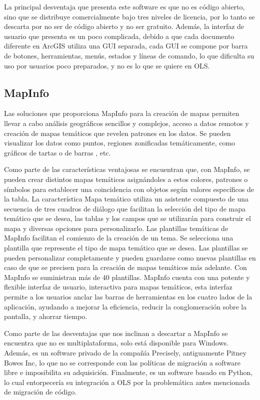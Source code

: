 La principal desventaja que presenta este software es que no es c\'odigo abierto, sino que se distribuye comercialmente bajo tres niveles de licencia, por lo tanto se descarta por no ser de c\'odigo abierto y no ser gratuito. Adem\'as, la interfaz de usuario que presenta es un poco complicada, debido a que cada documento diferente en ArcGIS utiliza una GUI separada, cada GUI se compone por barra de botones, herramientas, men\'us, estados y l\'ineas de comando, lo que dificulta su uso por usuarios poco preparados, y no es lo que se quiere en OLS.


\subsection{MapInfo}
Las soluciones que proporciona MapInfo para la creaci\'on de mapas permiten llevar a cabo an\'alisis geogr\'aficos sencillos y complejos, acceso a datos remotos y creaci\'on de mapas tem\'aticos que revelen patrones en los datos. Se pueden visualizar los
datos como puntos, regiones zonificadas tem\'aticamente, como gr\'aficos de tartas o de barras , etc.

Como parte de las caracter\'isticas ventajosas se encuentran que, con MapInfo, se pueden crear distintos mapas tem\'aticos asign\'andoles a estos colores, patrones o s\'imbolos para establecer una coincidencia con objetos seg\'un valores espec\'ificos de la tabla. La caracter\'istica Mapa tem\'atico utiliza un asistente compuesto de una secuencia de tres cuadros de di\'alogo que facilitan la selecci\'on del tipo de mapa tem\'atico que se desea, las tablas y los campos que se utilizar\'an para construir el mapa y diversas opciones para personalizarlo. Las plantillas tem\'aticas de MapInfo facilitan el comienzo de la creaci\'on de un tema. Se selecciona una plantilla que represente el tipo de mapa tem\'atico que se desea. Las plantillas se pueden personalizar completamente y pueden guardarse como nuevas plantillas en caso de que se precisen para la creaci\'on de mapas tem\'aticos m\'as adelante. Con MapInfo se suministran m\'as de 40 plantillas. MapInfo cuenta con una potente y flexible interfaz de usuario, interactiva para mapas tem\'aticos, esta interfaz permite a los usuarios anclar las barras de herramientas en los cuatro lados de la aplicaci\'on, ayudando a mejorar la eficiencia, reducir la conglomeraci\'on sobre la pantalla, y ahorrar tiempo.

Como parte de las desventajas que nos inclinan a descartar a MapInfo se encuentra que no es multiplataforma, solo est\'a disponible para Windows. Adem\'as, es un software privado de la compa\~n\'ia Precisely, antiguamente Pitney Bowes Inc, lo que no se corresponde con las pol\'iticas de migraci\'on a software libre e imposibilita su adquisici\'on. Finalmente, es un software basado en Python, lo cual entorpecer\'ia su integraci\'on a OLS por la problem\'atica antes mencionada de migraci\'on de c\'odigo.


